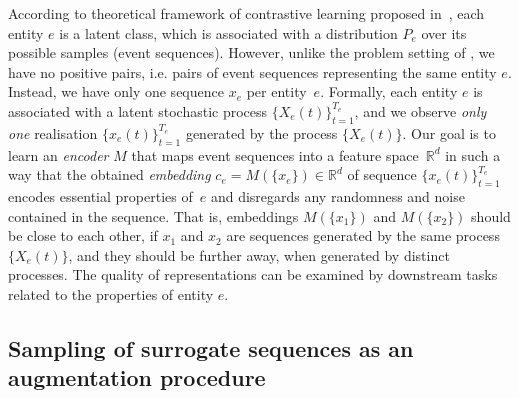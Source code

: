 \documentclass{article}
\newcommand{\R}{\mathbb{R}}
\begin{document}
According to theoretical framework of contrastive learning proposed in~\cite{Saunshi2019ICML}, each entity $e$ is a latent class, which is associated with a distribution $P_e$ over its possible samples (event sequences). However, unlike the problem setting of  \cite{Saunshi2019ICML}, we have no positive pairs, i.e. pairs of event sequences representing the same entity $e$. Instead, we have only one sequence $x_e$ per entity~$e$. Formally, each entity $e$ is associated with a latent stochastic process $\{X_e(t)\}_{t=1}^{T_e}$, and we observe {\it only one} realisation $\{x_e(t)\}_{t=1}^{T_e}$ generated by the process $\{X_e(t)\}$. Our goal is to learn an \textit{encoder} $M$ that maps event sequences into a feature space~$\R^d$ in such a way that the obtained \textit{embedding} $c_e=M(\{x_e\})\in \R^d$ of sequence $\{x_e(t)\}^{T_e}_{t=1}$ encodes essential properties of~$e$ and disregards any randomness and noise contained in the sequence. That is, embeddings $M(\{x_1\})$ and $M(\{x_2\})$ should be close to each other, if $x_1$ and $x_2$ are sequences generated by the same process $\{X_e(t)\}$, and they should be further away, when generated by distinct processes. The quality of representations can be examined by downstream tasks related to the properties of entity $e$. %

\subsection{Sampling of surrogate sequences as an augmentation procedure} \label{sec-pos-pairs}
\end{document}
